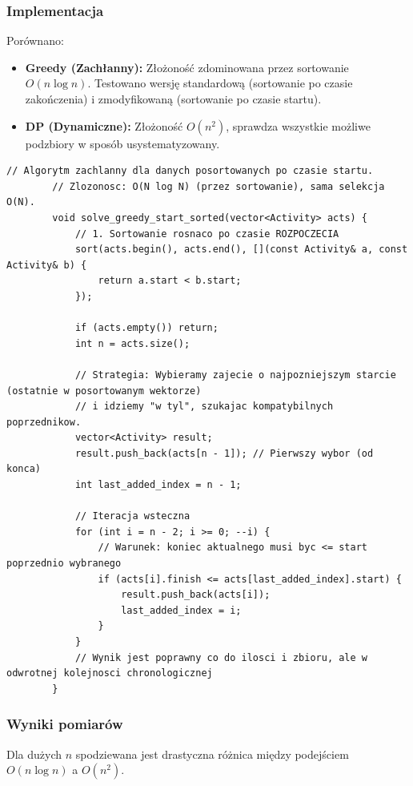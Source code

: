 \documentclass{article}
\begin{document}
	\subsubsection{Implementacja}
	Porównano:
	\begin{itemize}
		\item \textbf{Greedy (Zachłanny):} Złożoność zdominowana przez sortowanie $O(n \log n)$. Testowano wersję standardową (sortowanie po czasie zakończenia) i zmodyfikowaną (sortowanie po czasie startu).
		\item \textbf{DP (Dynamiczne):} Złożoność $O(n^2)$, sprawdza wszystkie możliwe podzbiory w sposób usystematyzowany.
	\end{itemize}
	\newpage
	\begin{lstlisting}[caption={Zmodyfikowany greedy}]
		// Algorytm zachlanny dla danych posortowanych po czasie startu.
		// Zlozonosc: O(N log N) (przez sortowanie), sama selekcja O(N).
		void solve_greedy_start_sorted(vector<Activity> acts) {
			// 1. Sortowanie rosnaco po czasie ROZPOCZECIA
			sort(acts.begin(), acts.end(), [](const Activity& a, const Activity& b) {
				return a.start < b.start;
			});
			
			if (acts.empty()) return;
			int n = acts.size();
			
			// Strategia: Wybieramy zajecie o najpozniejszym starcie (ostatnie w posortowanym wektorze)
			// i idziemy "w tyl", szukajac kompatybilnych poprzednikow.
			vector<Activity> result;
			result.push_back(acts[n - 1]); // Pierwszy wybor (od konca)
			int last_added_index = n - 1;
			
			// Iteracja wsteczna
			for (int i = n - 2; i >= 0; --i) {
				// Warunek: koniec aktualnego musi byc <= start poprzednio wybranego
				if (acts[i].finish <= acts[last_added_index].start) {
					result.push_back(acts[i]);
					last_added_index = i;
				}
			}
			// Wynik jest poprawny co do ilosci i zbioru, ale w odwrotnej kolejnosci chronologicznej
		}
	\end{lstlisting}
	
	\subsubsection{Wyniki pomiarów}
	Dla dużych $n$ spodziewana jest drastyczna różnica między podejściem $O(n \log n)$ a $O(n^2)$.
	
	\begin{table}[H]
		\centering
		\caption{Porównanie algorytmów Greedy i DP}
	\end{table}
	
\end{document}
